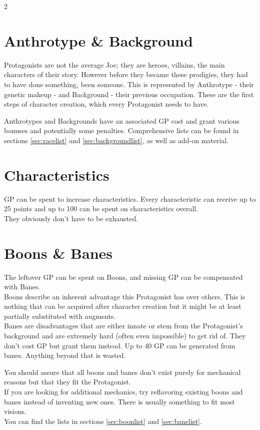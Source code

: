 \documentclass[11pt,a4paper,openany,dvipsnames]{book}
\begin{document}
	\begin{multicols}{2}
	\begin{enumerate}
		\newcommand{\lastcategory}{-}
	\end{enumerate}
	\end{multicols}

	\section{Anthrotype \& Background}
	Protagonists are not the average Joe; they are heroes, villains, the main characters of their story.
	However before they became these prodigies, they had to have done something, been someone.
	This is represented by Anthrotype - their genetic makeup - and Background - their previous occupation.
	These are the first steps of character creation, which every Protagonist needs to have.
	\par
	Anthrotypes and Backgrounds have an associated GP cost and grant various bonuses and potentially some penalties.
	Comprehensive lists can be found in sections \ref{sec:racelist} and \ref{sec:backgroundlist}, as well as add-on material.
	\section{Characteristics}
	GP can be spent to increase characteristics. Every characteristic can receive up to 25 points and up to 100 can be spent on characteristics overall.\\
	They obviously don’t have to be exhausted.
	\section{Boons \& Banes}
	The leftover GP can be spent on Boons, and missing GP can be compensated with Banes.\\
	Boons describe an inherent advantage this Protagonist has over others.
	This is nothing that can be acquired after character creation
		but it might be at least partially substituted with augments.
	\\%
	Banes are disadvantages that are either innate or stem from the Protagonist’s background and are extremely hard (often even impossible) to get rid of.
	They don’t cost GP but grant them instead.
	Up to 40 GP can be generated from banes.
	Anything beyond that is wasted.
	\par
	You should assure that all boons and banes don’t exist purely for mechanical reasons but that they fit the Protagonist.
	\\%
	If you are looking for additional mechanics, try reflavoring existing boons and banes instead of inventing new ones. There is usually something to fit most visions.\\
	You can find the lists in sections \ref{sec:boonlist} and \ref{sec:banelist}.
\end{document}
